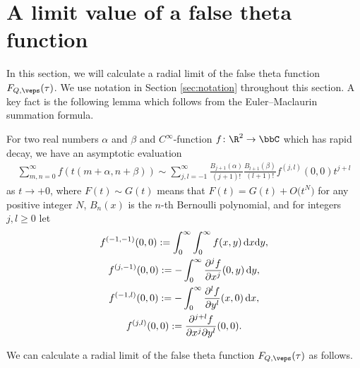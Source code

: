 
\section{A limit value of a false theta function} \label{sec:false_theta_lim}


In this section, we will calculate a radial limit of the false theta function $ F_{Q, \veps} (\tau) $.
We use notation in Section \ref{sec:notation} throughout this section.
A key fact is the following lemma which follows from the Euler--Maclaurin summation formula.

\begin{lem} \label{lem:Euler-Maclaurin}
	For two real numbers $ \alpha $ and $ \beta $ and $ C^\infty $-function $ f \colon \R^2 \to \bbC $ which has rapid decay, we have an asymptotic evaluation
	\begin{gather*}
	\sum_{m, n = 0}^{\infty} f(t(m+\alpha, n+\beta))
	\sim \sum_{j,l = -1}^{\infty} \frac{B_{j+1}(\alpha)}{(j+1)!} \frac{B_{l+1}(\beta)}{(l+1)!} f^{(j, l)}(0, 0) t^{j+l}
	\end{gather*}
	as $ t \to +0 $, where $ F(t) \sim G(t) $ means that $ F(t) = G(t) + O\big(t^N\big) $ for any positive integer $ N $,
	$ B_n(x) $ is the $ n $-th Bernoulli polynomial, and for integers $ j, l \ge 0 $ let
	\begin{gather*}
		f^{(-1, -1)}(0, 0) := \int_0^\infty \int_0^\infty f(x, y)\, {\rm d}x {\rm d}y, \\
		f^{(j, -1)}(0, 0) := -\int_0^\infty \frac{\partial^j f}{\partial x^j} (0, y)\, {\rm d}y, \\
		f^{(-1, l)}(0, 0) := -\int_0^\infty \frac{\partial^l f}{\partial y^l} (x, 0) \,{\rm d}x, \\
		f^{(j, l)}(0, 0) := \frac{\partial^{j+l} f}{\partial x^j \partial y^l} (0, 0).
	\end{gather*}
\end{lem}

We can calculate a radial limit of the false theta function $ F_{Q, \veps} (\tau) $ as follows.

